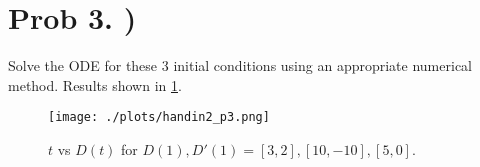 \section{Prob 3. )}

Solve the ODE for these 3 initial conditions using an appropriate numerical method. Results shown in \ref{fig:fig1}.



\begin{figure}[ht!]
  \centering
  \texttt{[image: ./plots/handin2\_p3.png]}
  \caption{$t$ vs $D(t)$ for $D(1), D'(1) = [3,2], [10,-10], [5,0]$.}
  \label{fig:fig1}
\end{figure}